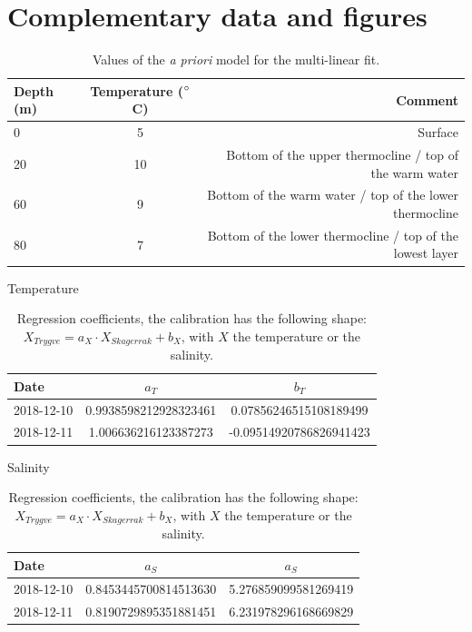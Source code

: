 \documentclass[12pt,a4paper]{article}
\begin{document}




\newpage

\appendix
\setcounter{figure}{0}

\section{Complementary data and figures}

\begin{table}[h]
  \centering
  \begin{tabular}{|l|c|r|}
    \hline
    Depth (m) & Temperature ($^{\circ}$C) & Comment \\
    \hline
    0 & 5 & Surface\\
    20 & 10 & Bottom of the upper thermocline / top of the warm water\\
    60 & 9 & Bottom of the warm water / top of the lower thermocline\\
    80 & 7 & Bottom of the lower thermocline / top of the lowest layer\\
    \hline
  \end{tabular}
  \caption{\label{tab:apriori}Values of the {\it a priori} model for the multi-linear fit.}
\end{table}

\begin{table}[h]
  \centering
  Temperature\\
  \begin{tabular}{|l|c|c|}
    \hline
    Date & $a_T$ & $b_T$ \\
    \hline
    2018-12-10 & 0.9938598212928323461 & 0.07856246515108189499\\
    2018-12-11 & 1.006636216123387273  & -0.09514920786826941423\\
    \hline
  \end{tabular}
  
  \vspace{.5cm}
  Salinity\\
  \begin{tabular}{|l|c|c|}
    \hline
    Date & $a_S$ & $a_S$ \\
    \hline
    2018-12-10 & 0.8453445700814513630 & 5.276859099581269419\\
    2018-12-11 & 0.8190729895351881451 & 6.231978296168669829\\
    \hline
  \end{tabular}
  \caption{\label{tab:calib}Regression coefficients, the calibration has the following
    shape:
    ${X_{Trygve} = a_X \cdot X_{Skagerrak} + b_X}$, with $X$
    the temperature or the salinity.}
\end{table}
\end{document}
